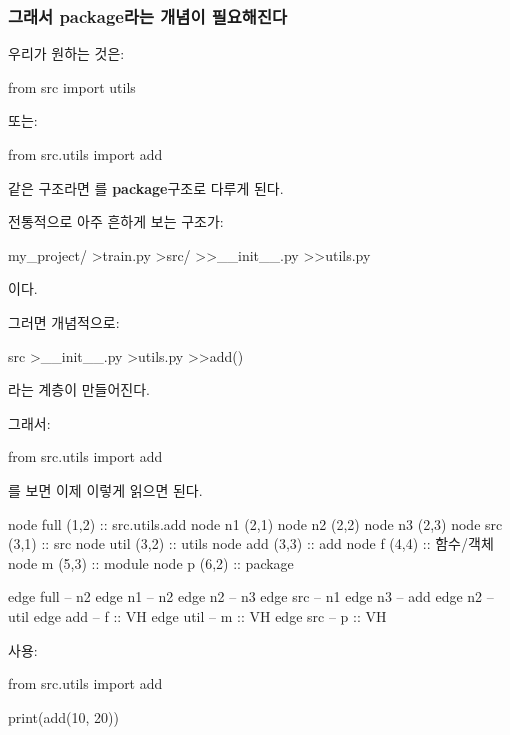 \subsubsection{그래서 package라는 개념이 필요해진다}

우리가 원하는 것은:

\begin{dhkcode}
from src import utils
\end{dhkcode}

또는:

\begin{dhkcode}
from src.utils import add
\end{dhkcode}

같은 구조라면 를 \textbf{package}구조로 다루게 된다.

전통적으로 아주 흔하게 보는 구조가:

\begin{dhkdir}
my_project/
>train.py
>src/
>>__init__.py
>>utils.py
\end{dhkdir}

이다.

그러면 개념적으로:

\begin{dhkdir}
src
>__init__.py
>utils.py
>>add()
\end{dhkdir}

라는 계층이 만들어진다.

그래서:

\begin{dhkcode}
from src.utils import add
\end{dhkcode}

를 보면 이제 이렇게 읽으면 된다.

\begin{dhkdiagram}[in=8]
node full (1,2) :: src.utils.add
node n1 (2,1)
node n2 (2,2)
node n3 (2,3)
node src (3,1) :: src
node util (3,2) :: utils
node add (3,3) :: add
node f (4,4) :: 함수/객체
node m (5,3) :: module
node p (6,2) :: package

edge full -- n2
edge n1 -- n2
edge n2 -- n3
edge src -- n1
edge n3 -- add
edge n2 -- util
edge add -- f :: VH
edge util -- m :: VH
edge src -- p :: VH
\end{dhkdiagram}

사용:

\begin{dhkcode}
from src.utils import add

print(add(10, 20))
\end{dhkcode}

